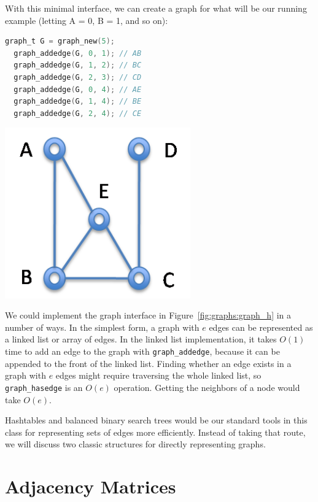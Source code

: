 With this minimal interface, we can create a graph for what will be
our running example (letting A = 0, B = 1, and so on):

\noindent
\begin{minipage}{0.6\textwidth}
\begin{lstlisting}[language=c]
  graph_t G = graph_new(5);
  graph_addedge(G, 0, 1); // AB
  graph_addedge(G, 1, 2); // BC
  graph_addedge(G, 2, 3); // CD
  graph_addedge(G, 0, 4); // AE
  graph_addedge(G, 1, 4); // BE
  graph_addedge(G, 2, 4); // CE
\end{lstlisting}
\end{minipage}%
\begin{minipage}{0.4\textwidth}
\begin{center}
  \includegraphics[width=0.6\textwidth]{img/graph0.png}
\end{center}
\end{minipage}

We could implement the graph interface in Figure~\ref{fig:graphs:graph_h} in
a number of ways. In the simplest form, a graph with $e$ edges can be
represented as a linked list or array of edges. In the linked list
implementation, it takes $O(1)$ time to add an edge to the graph with
\lstinline'graph_addedge', because it can be appended to the front of
the linked list. Finding whether an edge exists in a graph with $e$
edges might require traversing the whole linked list, so
\lstinline'graph_hasedge' is an $O(e)$ operation.  Getting the
neighbors of a node would take $O(e)$.

Hashtables and balanced binary search trees would be our standard
tools in this class for representing sets of edges more
efficiently. Instead of taking that route, we will discuss two classic
structures for directly representing graphs.


\section{Adjacency Matrices}
\label{sec:graphs:adjmatrix}

